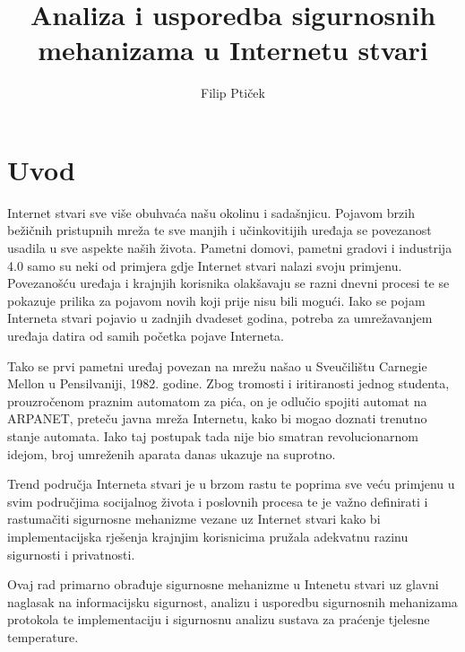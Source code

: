 \documentclass[times, utf8, diplomski]{fer}
\begin{document}

\title{Analiza i usporedba sigurnosnih mehanizama u Internetu stvari}

\author{Filip Ptiček}

\maketitle



\zahvala{}

\tableofcontents

\chapter{Uvod}
Internet stvari sve više obuhvaća našu okolinu i sadašnjicu. Pojavom brzih bežičnih pristupnih mreža te sve manjih i učinkovitijih uređaja se povezanost usadila u sve aspekte naših života. Pametni domovi, pametni gradovi i industrija 4.0 samo su neki od primjera gdje Internet stvari nalazi svoju primjenu. Povezanošću uređaja i krajnjih korisnika olakšavaju se razni dnevni procesi te se pokazuje prilika za pojavom novih koji prije nisu bili mogući. Iako se pojam Interneta stvari pojavio u zadnjih dvadeset godina, potreba za umrežavanjem uređaja datira od samih početka pojave Interneta. 

Tako se prvi pametni uređaj povezan na mrežu našao u Sveučilištu Carnegie Mellon u Pensilvaniji, 1982. godine. Zbog tromosti i iritiranosti jednog studenta, prouzročenom praznim automatom za pića, on je odlučio spojiti automat na ARPANET, preteču javna mreža Internetu, kako bi mogao doznati trenutno stanje automata\citep{Coke}. Iako taj postupak tada nije bio smatran revolucionarnom idejom, broj umreženih aparata danas ukazuje na suprotno.

Trend područja Interneta stvari je u brzom rastu te poprima sve veću primjenu u svim područjima socijalnog života i poslovnih procesa te je važno definirati i rastumačiti sigurnosne mehanizme vezane uz Internet stvari kako bi implementacijska rješenja krajnjim korisnicima pružala adekvatnu razinu sigurnosti i privatnosti.

Ovaj rad primarno obrađuje sigurnosne mehanizme u Intenetu stvari uz glavni naglasak na informacijsku sigurnost, analizu i usporedbu sigurnosnih mehanizama protokola te implementaciju i sigurnosnu analizu sustava za praćenje tjelesne temperature. 
\end{document}
